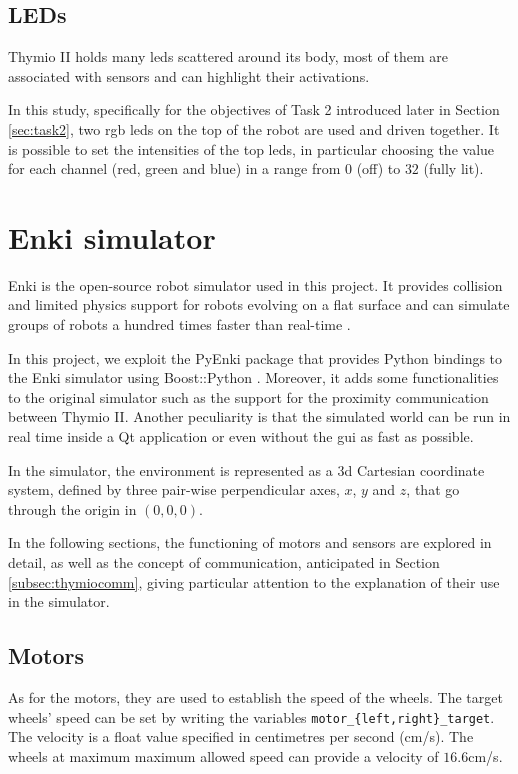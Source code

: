 \subsection{LEDs}
\label{subsec:thymioled}

Thymio II holds many \glspl{led} scattered around its body, most of them are 
associated 
with sensors and can highlight their activations.

In this study, specifically for the objectives of Task 2 introduced later in Section 
\ref{sec:task2}, two \gls{rgb} \glspl{led} on the top of the robot are used and 
driven together.
It is possible to set the intensities of the top \glspl{led}, in particular choosing the 
value for each channel (red, green and blue) in a range from $0$ (off) to $32$ 
(fully lit).

\section{Enki simulator}
\label{sec:enki}

Enki is the open-source robot simulator used in this project. It provides collision 
and limited physics support for robots evolving on a flat surface and can simulate 
groups of robots a hundred times faster than real-time \cite[see][]{enki}.

In this project, we exploit the PyEnki package \cite[][]{enki-jguzzi} that provides 
Python bindings to the Enki simulator using Boost::Python 
\cite[see][]{boostpython}.
Moreover, it adds some functionalities to the original simulator such as the 
support for the proximity communication between Thymio II.
Another peculiarity is that the simulated world can be run in real time inside a Qt 
application or even without the \gls{gui} as fast as possible.

In the simulator, the environment is represented as a \gls{3d} Cartesian 
coordinate system, defined by three pair-wise perpendicular axes, $x$, $y$ and 
$z$, that go through the origin in $(0, 0, 0)$. 

In the following sections, the functioning of motors and sensors are explored in 
detail, as well as the concept of communication, anticipated in Section 
\ref{subsec:thymiocomm}, giving particular attention to the explanation of their 
use in the simulator.

\subsection{Motors}
\label{subsec:enkimotors}
As for the motors, they are used to establish the speed of the wheels. The target 
wheels' speed can be set by writing the variables 
\texttt{motor\_\{left,right\}\_target}. The velocity is a float value specified in 
centimetres per second (\gls{cm/s}).
The wheels at maximum maximum allowed speed can provide a velocity of 
$16.6$\gls{cm/s}.

